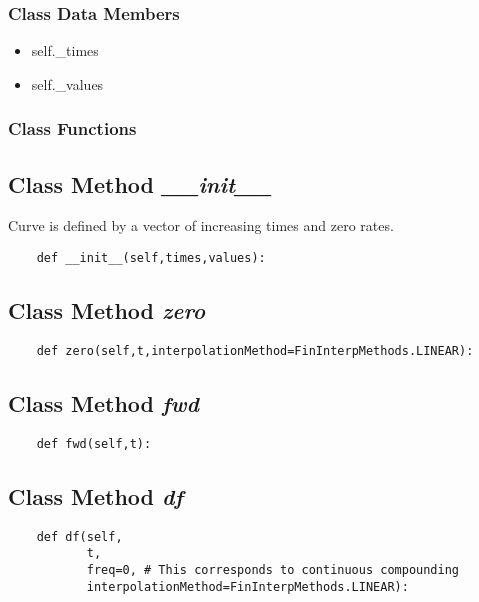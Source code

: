 \documentclass[twoside,11pt]{book}
\begin{document}
\subsubsection{Class Data Members}
\begin{itemize}
\item{self.\_times}
\item{self.\_values}
\end{itemize}

\subsubsection{Class Functions}

\subsection{Class Method {\it \_\_init\_\_}}
Curve is defined by a vector of increasing times and zero rates. 

\begin{lstlisting}
    def __init__(self,times,values):
\end{lstlisting}

\subsection{Class Method {\it zero}}


\begin{lstlisting}
    def zero(self,t,interpolationMethod=FinInterpMethods.LINEAR):
\end{lstlisting}

\subsection{Class Method {\it fwd}}


\begin{lstlisting}
    def fwd(self,t):
\end{lstlisting}

\subsection{Class Method {\it df}}


\begin{lstlisting}
    def df(self,
           t, 
           freq=0, # This corresponds to continuous compounding
           interpolationMethod=FinInterpMethods.LINEAR):
\end{lstlisting}
\end{document}
